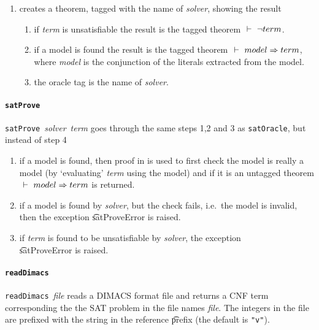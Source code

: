 \begin{enumerate}
\item creates a theorem, tagged with the name of {\it solver}, showing the result

\begin{enumerate}

\item if {\it term} is unsatisfiable the result is the tagged theorem $\ \vdash\  \neg term$.
\item if a model is found the result is the tagged theorem $\ \vdash\  model \Rightarrow term$,
where {\it model} is the conjunction of the literals extracted from the model.
\item the oracle tag is the name of {\it solver}.
\end{enumerate}
\end{enumerate}

\paragraph{\tt satProve}${}$\\
{\small{\tt satProve}~{\it solver}~{\it term}} goes through the same steps 1,2 and 3 
as {\tt satOracle}, but instead of step 4

\begin{enumerate}
\item  if a model is found, then proof in \HOL{} is used to first check the model
is really a model (by `evaluating' {\it term} using the model) and if it
is an untagged theorem $\ \vdash\  model \Rightarrow term$ is returned.

\item if a model is found by {\it solver}, but the \HOL{} check fails, 
i.e.~the model is invalid, then the exception \t{satProveError} is raised.

\item if {\it term} is found to be unsatisfiable by {\it solver},
the exception \\ \t{satProveError} is raised.

\end{enumerate}

\paragraph{\tt readDimacs}${}$\\

{\small{\tt readDimacs}~{\it file}} reads a DIMACS format file and returns
a CNF \HOL{} term corresponding the the SAT problem in the file names {\it file}.
The integers in the file are prefixed with the string in the reference 
\t{prefix} (the default is {\small\verb+"v"+}).

